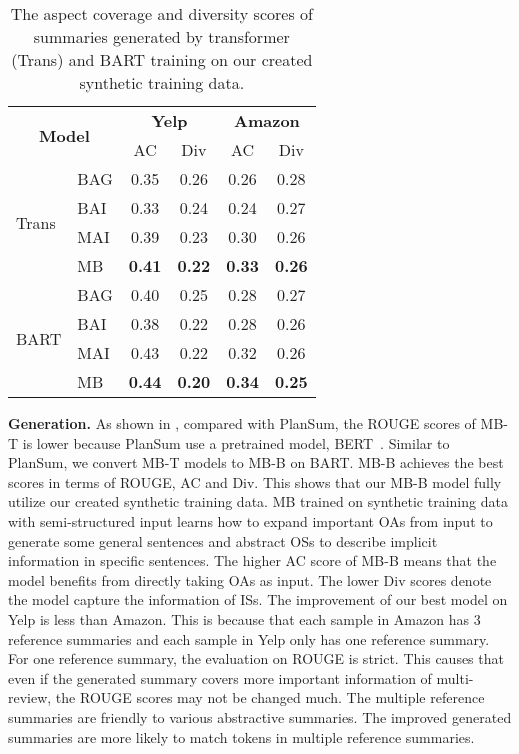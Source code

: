 \begin{table}[th]
	\centering
	\small
		\begin{tabular}{|l|l|c|c|c|c|}
			\hline
			\multicolumn{2}{|c|}{\multirow{2}{*}{\bf Model}} & \multicolumn{2}{c|}{\bf Yelp} &  \multicolumn{2}{c|}{\bf Amazon} \\ \cline{3-6}
			\multicolumn{2}{|c|}{} & AC & Div & AC & Div \\
			\hline
			\multirow{4}{*}{Trans} & BAG & 0.35 & 0.26  & 0.26& 0.28 \\
			& BAI & 0.33 & 0.24 &0.24 & 0.27 \\
			& MAI & 0.39&  0.23 & 0.30 & 0.26 \\
			& MB & \bf 0.41 & \bf 0.22 & \bf 0.33 & \bf 0.26\\
			\hline
			\multirow{4}{*}{BART} & BAG &0.40 & 0.25 &0.28 & 0.27 \\
			& BAI & 0.38 & 0.22 & 0.28 & 0.26 \\
			& MAI & 0.43 & 0.22 & 0.32 & 0.26 \\
			& MB & \bf 0.44 & \bf 0.20 &\bf 0.34 & \bf 0.25 \\
			\hline
		\end{tabular}
	\caption{The aspect coverage and diversity scores of summaries generated by transformer (Trans) and BART training on our created synthetic training data.
	}\label{tab:acdv}  
\end{table}


   
    
\textbf{Generation.}
As shown in ,
compared with PlanSum, the ROUGE scores of MB-T is lower
because PlanSum use a pretrained model, BERT~\cite{BERT19}.
Similar to PlanSum, we convert MB-T models to MB-B on BART.
MB-B achieves the best scores in terms of ROUGE, AC and Div.
This shows that our MB-B model 
fully utilize our created synthetic training data.
MB trained on synthetic training data with semi-structured input
learns how to expand important OAs from input to generate some general
sentences and abstract OSs to describe implicit information 
in specific sentences.
The higher AC score of MB-B means
that the model benefits from directly taking OAs as input.
The lower Div scores denote the model capture the information of
ISs.
The improvement of our best model on Yelp is less than Amazon.
This is because that each sample in Amazon has 3 reference summaries and each sample in Yelp only has one reference summary.
For one reference summary,
the evaluation on ROUGE is strict.
This causes that even if the generated summary covers
more important information of multi-review, 
the ROUGE scores may not be changed much.
The multiple reference summaries are friendly to various abstractive summaries.
The improved generated summaries are more likely to match tokens
in multiple reference summaries. 

